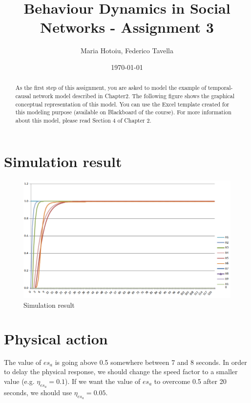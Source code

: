 \documentclass[a4paper]{article}
\title{Behaviour Dynamics in Social Networks - Assignment 3}
\author{Maria Hotoiu, Federico Tavella}
\date{\today}
\begin{document}
\maketitle

\begin{abstract}
As the first step of this assignment, you are asked to model the example of temporal-causal network
model described in Chapter2. The following figure shows the graphical conceptual representation of
this model. You can use the Excel template created for this modeling purpose (available on Blackboard
of the course). For more information about this model, please read Section 4 of Chapter 2.
\end{abstract}

\section{Simulation result}

\begin{figure}[!htpb]
\center
\includegraphics[width=\textwidth]{res/img/results}
\caption{Simulation result}
\label{fig:simulation_result}
\end{figure}

\section{Physical action}

The value of $es_a$ is going above 0.5 somewhere between 7 and 8 seconds. In order to delay the physical response, we should change the speed factor to a smaller value (e.g. $\eta_{es_{a}} = 0.1$). If we want the value of $es_{a}$ to overcome 0.5 after 20 seconds, we should use $\eta_{es_{a}} = 0.05$.
\end{document}
